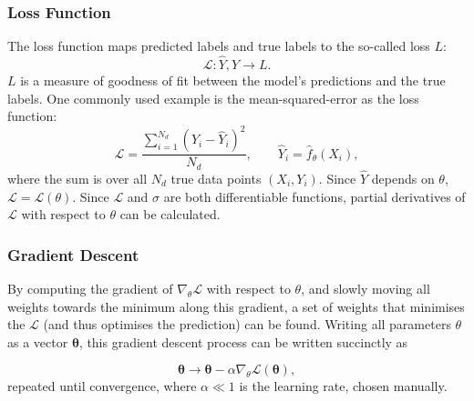         \subsubsection{Loss Function}
            The loss function maps predicted labels and true labels to the so-called loss $L$: \[\mathcal{L} : \hat{Y}, Y \rightarrow L.\] $L$ is a measure of goodness of fit between the \gls{model}'s predictions and the true labels. One commonly used example is the mean-squared-error as the loss function:
            \begin{equation}
                \mathcal{L} = \frac{\sum_{i = 1}^{N_d}(Y_i - \hat{Y}_i)^2}{N_d}, \hspace{2em} \hat{Y}_i = \hat{f}_\theta(X_i),
            \end{equation}
            where the sum is over all $N_d$ true data points $(X_i, Y_i)$.
            Since $\hat{Y}$ depends on $\theta$, $\mathcal{L} = \mathcal{L}(\theta)$. Since $\mathcal{L}$ and $\sigma$ are both differentiable functions, partial derivatives of $\mathcal{L}$ with respect to $\theta$ can be calculated.

        \subsubsection{Gradient Descent}
            By computing the gradient of $\nabla_\theta \mathcal{L}$ with respect to $\theta$, and slowly moving all weights towards the minimum along this gradient, a set of weights that minimises the $\mathcal{L}$ (and thus optimises the prediction) can be found. Writing all parameters $\theta$ as a vector $\boldsymbol{\theta}$, this gradient descent process can be written succinctly as

            \begin{equation}
                \boldsymbol{\theta} \rightarrow \boldsymbol{\theta} - \alpha \nabla_\theta \mathcal{L}(\boldsymbol{\theta}),
            \end{equation}
            repeated until convergence, where $\alpha \ll 1$ is the learning rate, chosen manually.
